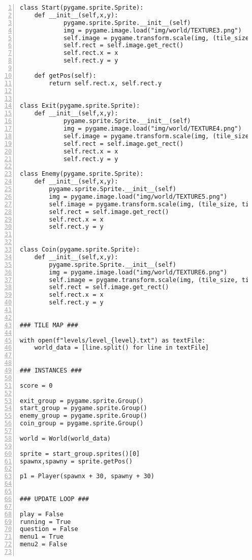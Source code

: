 \documentclass[12pt]{report}
\begin{document}
\begin{Verbatim}[numbers=left, frame=single]
class Start(pygame.sprite.Sprite):
    def __init__(self,x,y):
            pygame.sprite.Sprite.__init__(self)
            img = pygame.image.load("img/world/TEXTURE3.png")
            self.image = pygame.transform.scale(img, (tile_size+58, tile_size+60))
            self.rect = self.image.get_rect()
            self.rect.x = x
            self.rect.y = y

    def getPos(self):
        return self.rect.x, self.rect.y
            

class Exit(pygame.sprite.Sprite):
    def __init__(self,x,y):
            pygame.sprite.Sprite.__init__(self)
            img = pygame.image.load("img/world/TEXTURE4.png")
            self.image = pygame.transform.scale(img, (tile_size +59, tile_size+60))
            self.rect = self.image.get_rect()
            self.rect.x = x
            self.rect.y = y

class Enemy(pygame.sprite.Sprite):
    def __init__(self,x,y):
        pygame.sprite.Sprite.__init__(self)
        img = pygame.image.load("img/world/TEXTURE5.png")
        self.image = pygame.transform.scale(img, (tile_size, tile_size - 10))
        self.rect = self.image.get_rect()
        self.rect.x = x
        self.rect.y = y


class Coin(pygame.sprite.Sprite):
    def __init__(self,x,y):
        pygame.sprite.Sprite.__init__(self)
        img = pygame.image.load("img/world/TEXTURE6.png")
        self.image = pygame.transform.scale(img, (tile_size, tile_size))
        self.rect = self.image.get_rect()
        self.rect.x = x
        self.rect.y = y


### TILE MAP ###

with open(f"levels/level_{level}.txt") as textFile:
    world_data = [line.split() for line in textFile]


### INSTANCES ###

score = 0                                                                     

exit_group = pygame.sprite.Group()
start_group = pygame.sprite.Group()
enemy_group = pygame.sprite.Group()
coin_group = pygame.sprite.Group()

world = World(world_data)

sprite = start_group.sprites()[0]
spawnx,spawny = sprite.getPos()

p1 = Player(spawnx + 30, spawny + 30)


### UPDATE LOOP ###

play = False                                                                                                                                           
running = True
question = False
menu1 = True
menu2 = False


\end{Verbatim}
\end{document}
